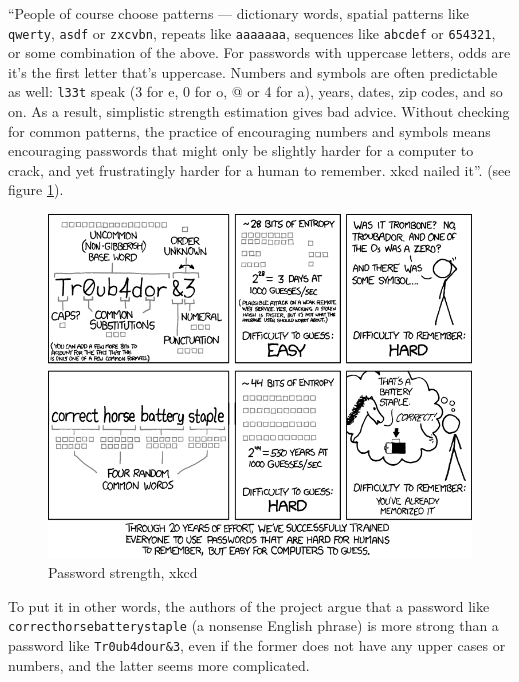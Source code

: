 ``People of course choose patterns — dictionary words, spatial patterns like \texttt{qwerty}, \texttt{asdf} or \texttt{zxcvbn}, repeats like \texttt{aaaaaaa}, sequences like \texttt{abcdef} or \texttt{654321}, or some combination of the above. For passwords with uppercase letters, odds are it’s the first letter that’s uppercase. Numbers and symbols are often predictable as well: \texttt{l33t} speak (3 for e, 0 for o, @ or 4 for a), years, dates, zip codes, and so on.
As a result, simplistic strength estimation gives bad advice. Without checking for common patterns, the practice of encouraging numbers and symbols means encouraging passwords that might only be slightly harder for a computer to crack, and yet frustratingly harder for a human to remember. xkcd nailed it''. (see figure \ref{fig:xkcd}). \cite{zxdropbox}

\begin{figure}[htb]
  \centering
  \captionsetup{justification=centering}
  \includegraphics[width=\columnwidth]{chapters/figures/development/xkcd.png}
  \caption{Password strength, xkcd \cite{xkcd}}
  \label{fig:xkcd}
\end{figure}

To put it in other words, the authors of the project argue that a password like \texttt{correcthorsebatterystaple} (a nonsense English phrase) is more strong than a password like \texttt{Tr0ub4dour\&3}, even if the former does not have any upper cases or numbers, and the latter seems more complicated.

